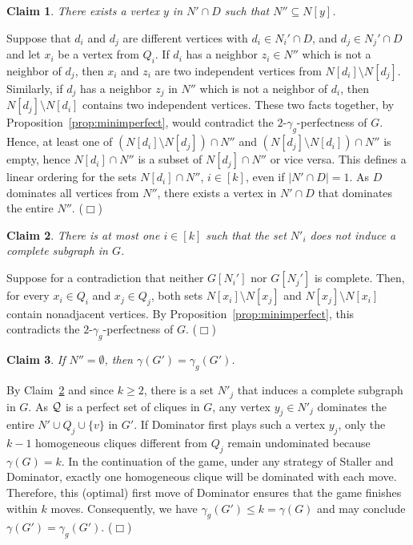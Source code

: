 \documentclass[12pt]{article}
\newtheorem{claim}{Claim}
\newcommand{\proof}{\noindent{\bf Proof.\ }}
\newcommand{\cQ}{{\cal Q}}
\newcommand{\smallqed}{{\tiny ($\Box$)}}
\begin{document}
\begin{claim}
	\label{claim:1}
	There exists a vertex $y$ in $N'\cap D$ such that $N'' \subseteq N[y]$.
\end{claim}
\proof  
Suppose that $d_i$ and $d_j$ are different vertices with $d_i\in N_i'\cap D$, and $d_j \in N_j' \cap D$ and let $x_i$ be a vertex from $Q_i$. If $d_i$ has a neighbor $z_i\in N''$ which is not a neighbor of $d_j$, then $x_i$ and $z_i$ are two independent vertices from $ N\left[ d_i\right] \setminus  N\left[ d_j\right]$. Similarly, if $d_j$ has a neighbor $z_j$ in $N''$ which is not a neighbor of $d_i$, then $ N\left[ d_j\right] \setminus  N\left[ d_i\right]$ contains two independent vertices. These two facts together, by Proposition~\ref{prop:minimperfect}, would contradict the $2$-$\gamma_g$-perfectness of $G$. Hence, at least one of $(N\left[ d_i\right] \setminus N\left[ d_j\right])\cap N''$ and $(N\left[ d_j\right] \setminus N\left[ d_i\right])\cap N''$ is empty, hence $N\left[ d_i\right]\cap N''$ is a subset of $N\left[ d_j\right]\cap N''$ or vice versa. This defines a linear ordering for the sets $N\left[ d_i\right]\cap N''$, $i\in [ k]$, even if $|N'\cap D| = 1$. As $D$ dominates all vertices from $N''$,  there exists a vertex in $N'\cap D$ that dominates the entire $N''$. \smallqed

\medskip

\begin{claim}
	\label{claim:2}
	There is at most one $i\in [k]$ such that the set $N'_i$ does not induce a complete subgraph in $G$. 
\end{claim}
\proof Suppose for a contradiction that neither $G[N_i']$ nor $G[N_j']$ is complete. Then, for every $x_i\in Q_i$ and $x_j\in Q_j$, both sets $N[x_i]\setminus N[x_j]$ and $N[x_j]\setminus N[x_i]$ contain nonadjacent vertices. By Proposition~\ref{prop:minimperfect}, this contradicts the $2$-$\gamma_g$-perfectness of $G$. \smallqed
\medskip

\begin{claim}
	\label{claim:3}
	If $N''=\emptyset$, then $\gamma(G')=\gamma_g(G')$. 
\end{claim}
\proof By Claim~\ref{claim:2} and since $k \ge 2$, there is a set $N'_j$ that induces a complete subgraph in $G$. As $\cQ$ is a perfect set of cliques in $G$, any vertex $y_j \in N'_j$ dominates the entire $N' \cup Q_j \cup \{v\}$ in $G'$. If Dominator first plays such a vertex $y_j$, only the $k-1$ homogeneous cliques different from $Q_j$ remain undominated because $\gamma(G) = k$. In the continuation of the game, under any strategy of Staller and Dominator, exactly one homogeneous clique will be dominated with each move. Therefore, this (optimal) first move of Dominator ensures that the game finishes within $k$ moves. Consequently, we have $\gamma_g(G') \le k=\gamma(G)$ and  may conclude $\gamma(G')=\gamma_g(G')$. \smallqed
\end{document}
